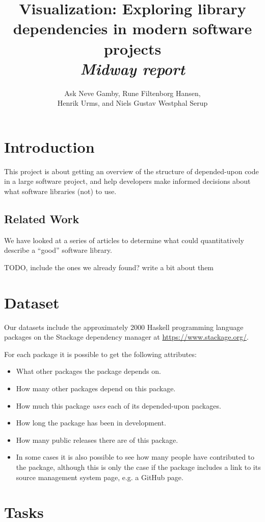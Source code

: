 \documentclass[a4paper,12pt]{article}
\title{\textbf{Visualization}: Exploring library dependencies in modern software projects\\\emph{Midway report}}
\author{Ask Neve Gamby, Rune Filtenborg Hansen,\\
Henrik Urms, and Niels Gustav Westphal Serup}
\begin{document}
\maketitle

\section{Introduction}

This project is about getting an overview of the structure of depended-upon code
in a large software project, and help developers make informed decisions about
what software libraries (not) to use.


\subsection{Related Work}

We have looked at a series of articles to determine what could quantitatively
describe a ``good'' software library.

TODO, include the ones we already found? write a bit about them


\section{Dataset}

Our datasets include the approximately 2000 Haskell programming language
packages on the Stackage dependency manager at \url{https://www.stackage.org/}.

For each package it is possible to get the following attributes:

\begin{itemize}
\item What other packages the package depends on.
\item How many other packages depend on this package.
\item How much this package \emph{uses} each of its depended-upon
packages.
\item How long the package has been in development.
\item How many public releases there are of this package.
\item In some cases it is also possible to see how many people have contributed
to the package, although this is only the case if the package includes a link to
its source management system page, e.g. a GitHub page.
\end{itemize}


\section{Tasks}
\end{document}
